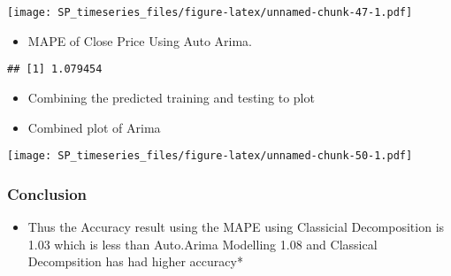 \documentclass[]{article}
\providecommand{\tightlist}{%
  \setlength{\itemsep}{0pt}\setlength{\parskip}{0pt}}
\begin{document}
\texttt{[image: SP\_timeseries\_files/figure-latex/unnamed-chunk-47-1.pdf]}

\begin{itemize}
\tightlist
\item
  MAPE of Close Price Using Auto Arima.
\end{itemize}

\begin{verbatim}
## [1] 1.079454
\end{verbatim}

\begin{itemize}
\item
  Combining the predicted training and testing to plot
\item
  Combined plot of Arima
\end{itemize}

\texttt{[image: SP\_timeseries\_files/figure-latex/unnamed-chunk-50-1.pdf]}

\subsubsection{Conclusion}\label{conclusion}

\begin{itemize}
\tightlist
\item
  Thus the Accuracy result using the MAPE using Classicial Decomposition
  is 1.03 which is less than Auto.Arima Modelling 1.08 and Classical
  Decompsition has had higher accuracy*
\end{itemize}
\end{document}

